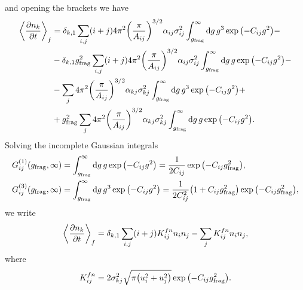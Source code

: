 \documentclass[aps,prl,preprint,groupedaddress,10pt]{revtex4-2}
\begin{document}
and opening the brackets we have
\begin{equation}
    \begin{split}
        \avg{\pdv{n_k}{t}}_f&=\delta_{k,1}\sum_{i,j}(i+j)4\pi^2\pqty{\frac{\pi}{A_{ij}}}^{3/2}
        \alpha_{ij}\sigma_{ij}^2\int_{\ltx{g}{frag}}^{\infty}
        \dd{g}g^3\exp\pqty{-C_{ij}g^2}-\\
        &-\delta_{k,1}\ltx{g}{frag}^2\sum_{i,j}(i+j)4\pi^2\pqty{\frac{\pi}{A_{ij}}}^{3/2}
        \alpha_{ij}\sigma_{ij}^2\int_{\ltx{g}{frag}}^{\infty}
        \dd{g}g\exp\pqty{-C_{ij}g^2}-\\
        &-\sum_{j}4\pi^2\pqty{\frac{\pi}{A_{ij}}}^{3/2}\alpha_{kj}\sigma_{kj}^2
        \int_{\ltx{g}{frag}}^{\infty}\dd{g}g^3\exp\pqty{-C_{ij}g^2}+\\
        &+\ltx{g}{frag}^2\sum_{j}4\pi^2\pqty{\frac{\pi}{A_{ij}}}^{3/2}\alpha_{kj}\sigma_{kj}^2
        \int_{\ltx{g}{frag}}^{\infty}\dd{g}g\exp\pqty{-C_{ij}g^2}.
    \end{split}
\end{equation}
Solving the incomplete Gaussian integrals
\begin{equation}
    \begin{split}
        G^{(1)}_{ij}(\ltx{g}{frag},\infty)&=\int_{\ltx{g}{frag}}^{\infty}
        \dd{g}g\exp\pqty{-C_{ij}g^2}=\frac{1}{2C_{ij}}\exp\pqty{-C_{ij}\ltx{g}{frag}^2},\\
        G^{(3)}_{ij}(\ltx{g}{frag},\infty)&=\int_{\ltx{g}{frag}}^{\infty}
        \dd{g}g^3\exp\pqty{-C_{ij}g^2}=
        \frac{1}{2C_{ij}^2}\pqty{1+C_{ij}\ltx{g}{frag}^2}\exp\pqty{-C_{ij}\ltx{g}{frag}^2},\\
    \end{split}
\end{equation}
we write
\begin{equation}
    \left\langle{\pdv{n_k}{t}}\right\rangle_f=\delta_{k,1}\sum_{i,j}(i+j)K^{fn}_{ij}n_in_j
    -\sum_{j}K^{fn}_{ij}n_in_j,
\end{equation}
where
\begin{equation}
    K^{fn}_{ij}=2\sigma_{kj}^2\sqrt{\pi\pqty{u_i^2+u_j^2}}
    \exp\pqty{-C_{ij}\ltx{g}{frag}^2}.
\end{equation}
\end{document}
